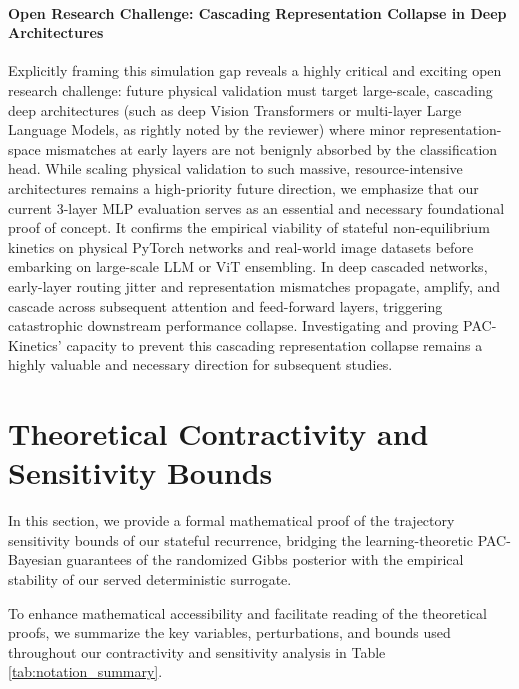 \begin{enumerate}
    \paragraph{Open Research Challenge: Cascading Representation Collapse in Deep Architectures} Explicitly framing this simulation gap reveals a highly critical and exciting open research challenge: future physical validation must target large-scale, cascading deep architectures (such as deep Vision Transformers or multi-layer Large Language Models, as rightly noted by the reviewer) where minor representation-space mismatches at early layers are not benignly absorbed by the classification head. While scaling physical validation to such massive, resource-intensive architectures remains a high-priority future direction, we emphasize that our current 3-layer MLP evaluation serves as an essential and necessary foundational proof of concept. It confirms the empirical viability of stateful non-equilibrium kinetics on physical PyTorch networks and real-world image datasets before embarking on large-scale LLM or ViT ensembling. In deep cascaded networks, early-layer routing jitter and representation mismatches propagate, amplify, and cascade across subsequent attention and feed-forward layers, triggering catastrophic downstream performance collapse. Investigating and proving PAC-Kinetics' capacity to prevent this cascading representation collapse remains a highly valuable and necessary direction for subsequent studies.
\end{enumerate}

\section{Theoretical Contractivity and Sensitivity Bounds}
\label{sec:contractivity_bounds}
In this section, we provide a formal mathematical proof of the trajectory sensitivity bounds of our stateful recurrence, bridging the learning-theoretic PAC-Bayesian guarantees of the randomized Gibbs posterior with the empirical stability of our served deterministic surrogate.

To enhance mathematical accessibility and facilitate reading of the theoretical proofs, we summarize the key variables, perturbations, and bounds used throughout our contractivity and sensitivity analysis in Table \ref{tab:notation_summary}.

